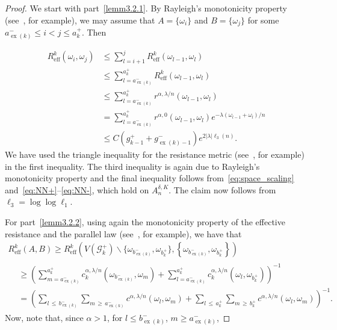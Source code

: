\documentclass[AHL,Unicode,longabstracts,published]{cedram}
\newcommand{\clG}{\mathcal{G}}
\newcommand{\eff}{\mathrm{eff}}
\newcommand\ex{\operatorname{ex}}
\newcommand{\aat}[1]{a_{\ex(#1)}^-}
\newcommand{\bt}[1]{b_{\ex(#1)}^-}
\newcommand{\gtt}[1]{g_{\ex(#1)-1}^-}
\begin{document}
\begin{proof}
We start with part~\eqref{lemm3.2.1}. By Rayleigh's monotonicity property (see~\cite[Section~1.4.1]{DS}, for example), we may assume that $A=\{\omega_i\}$ and $B=\{\omega_j\}$ for some $\aat{k}\leq i<j\leq a_k^+$. Then

\begin{align*}
{R}^k_\eff\left(\omega_i,\omega_j\right)&\leq {\textstyle \sum_{l=i+1}^{j}}{R}^k_\eff\left(\omega_{l-1},\omega_{l}\right)\\
&\leq {\textstyle \sum_{l=\aat{k}}^{a_k^+}}{R}^k_\eff\left(\omega_{l-1},\omega_{l}\right)\\
&\leq {\textstyle \sum_{l=\aat{k}}^{a_k^+}}r^{\alpha,\lambda/n}\left(\omega_{l-1},\omega_l\right)\\
&={\textstyle \sum_{l=\aat{k}}^{a_k^+}}r^{\alpha,0}\left(\omega_{l-1},\omega_l\right)e^{-\lambda\left(\omega_{l-1}+\omega_l\right)/n}\\
&\leq C\left(g_{k-1}^++\gtt{k}\right)e^{2|\lambda| \ell_3(n)}.
\end{align*}
We have used the triangle inequality for the resistance metric (see~\cite[Theorem~2.64]{Barbook}, for example) in the first inequality. The third inequality is again due to Rayleigh's monotonicity property and the final inequality follows from~\eqref{eq:space_scaling} and~\eqref{eq:NN+}--\eqref{eq:NN-}, which hold on $A_n^{\delta,K}$. The claim now follows from $\ell_3=\log\log \ell_1$.

For part~\eqref{lemm3.2.2}, using again the monotonicity property of the effective resistance and the parallel law (see~\cite[Remark~2.52]{Barbook}, for example), we have that
\begin{multline}\label{eq:Reff0bb}
{R}^k_\eff(A,B)
\geq {{R}^k_\eff\left(V\left(\clG_k^+\right)\backslash\{\omega_{\bt{k}},\omega_{{b}_k^+}\},\left\{\omega_{\bt{k}},\omega_{{b}_k^+}\right\}\right)}\\
\begin{aligned}
&\geq \left({\textstyle \sum_{m=\aat{k}}^{a_k^+}}c^{\alpha,\lambda/n}_k\left(\omega_{\bt{k}},\omega_m\right)+ {\textstyle \sum_{l=\aat{k}}^{a_k^+}}c^{\alpha,\lambda/n}_k\left(\omega_l,\omega_{b_k^+}\right)\right)^{-1}\\
&=\left({\textstyle \sum_{l\,\leq\, \bt{k}}\sum_{m\,\geq\,\aat{k}}}c^{\alpha,\lambda/n}\left(\omega_l,\omega_m\right)+ {\textstyle \sum_{l\,\leq\,a_k^+}\sum_{m\,\geq\,b_k^+}}c^{\alpha,\lambda/n}\left(\omega_l,\omega_m\right)\right)^{-1}.
\end{aligned}
\end{multline}
Now, note that, since $\alpha>1$, for $l\leq\bt{k}$, $m\geq \aat{k}$,


\end{proof}
\end{document}
